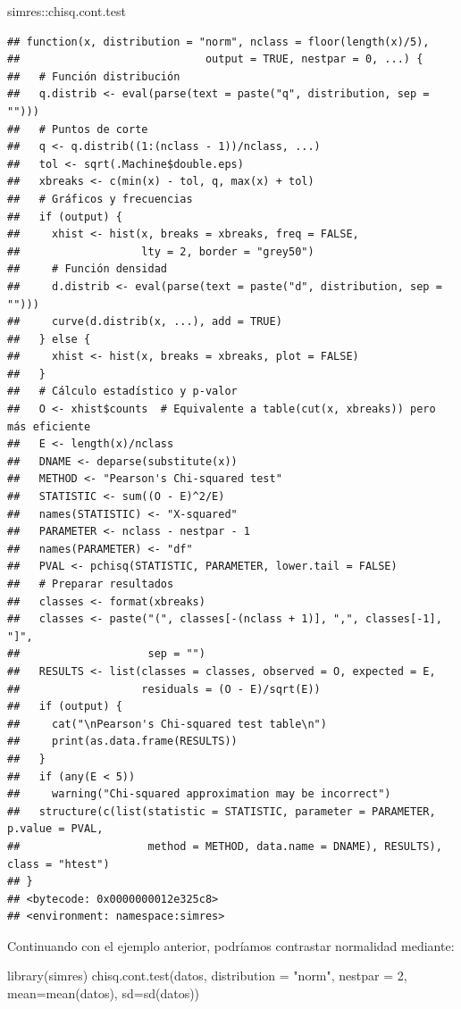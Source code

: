 \documentclass[
]{book}
\newenvironment{Shaded}{\begin{snugshade}}{\end{snugshade}}
\newcommand{\AttributeTok}[1]{\textcolor[rgb]{0.77,0.63,0.00}{#1}}
\newcommand{\DecValTok}[1]{\textcolor[rgb]{0.00,0.00,0.81}{#1}}
\newcommand{\FunctionTok}[1]{\textcolor[rgb]{0.00,0.00,0.00}{#1}}
\newcommand{\NormalTok}[1]{#1}
\newcommand{\SpecialCharTok}[1]{\textcolor[rgb]{0.00,0.00,0.00}{#1}}
\newcommand{\StringTok}[1]{\textcolor[rgb]{0.31,0.60,0.02}{#1}}
\theoremstyle{break}
\theoremstyle{nonumberplain}
\begin{document}
\begin{Shaded}
\begin{Highlighting}[]
\NormalTok{simres}\SpecialCharTok{::}\NormalTok{chisq.cont.test}
\end{Highlighting}
\end{Shaded}

\begin{verbatim}
## function(x, distribution = "norm", nclass = floor(length(x)/5),
##                             output = TRUE, nestpar = 0, ...) {
##   # Función distribución
##   q.distrib <- eval(parse(text = paste("q", distribution, sep = "")))
##   # Puntos de corte
##   q <- q.distrib((1:(nclass - 1))/nclass, ...)
##   tol <- sqrt(.Machine$double.eps)
##   xbreaks <- c(min(x) - tol, q, max(x) + tol)
##   # Gráficos y frecuencias
##   if (output) {
##     xhist <- hist(x, breaks = xbreaks, freq = FALSE,
##                   lty = 2, border = "grey50")
##     # Función densidad
##     d.distrib <- eval(parse(text = paste("d", distribution, sep = "")))
##     curve(d.distrib(x, ...), add = TRUE)
##   } else {
##     xhist <- hist(x, breaks = xbreaks, plot = FALSE)
##   }
##   # Cálculo estadístico y p-valor
##   O <- xhist$counts  # Equivalente a table(cut(x, xbreaks)) pero más eficiente
##   E <- length(x)/nclass
##   DNAME <- deparse(substitute(x))
##   METHOD <- "Pearson's Chi-squared test"
##   STATISTIC <- sum((O - E)^2/E)
##   names(STATISTIC) <- "X-squared"
##   PARAMETER <- nclass - nestpar - 1
##   names(PARAMETER) <- "df"
##   PVAL <- pchisq(STATISTIC, PARAMETER, lower.tail = FALSE)
##   # Preparar resultados
##   classes <- format(xbreaks)
##   classes <- paste("(", classes[-(nclass + 1)], ",", classes[-1], "]",
##                    sep = "")
##   RESULTS <- list(classes = classes, observed = O, expected = E,
##                   residuals = (O - E)/sqrt(E))
##   if (output) {
##     cat("\nPearson's Chi-squared test table\n")
##     print(as.data.frame(RESULTS))
##   }
##   if (any(E < 5))
##     warning("Chi-squared approximation may be incorrect")
##   structure(c(list(statistic = STATISTIC, parameter = PARAMETER, p.value = PVAL,
##                    method = METHOD, data.name = DNAME), RESULTS), class = "htest")
## }
## <bytecode: 0x0000000012e325c8>
## <environment: namespace:simres>
\end{verbatim}

Continuando con el ejemplo anterior, podríamos contrastar normalidad mediante:

\begin{Shaded}
\begin{Highlighting}[]
\FunctionTok{library}\NormalTok{(simres)}
\FunctionTok{chisq.cont.test}\NormalTok{(datos, }\AttributeTok{distribution =} \StringTok{"norm"}\NormalTok{, }\AttributeTok{nestpar =} \DecValTok{2}\NormalTok{, }\AttributeTok{mean=}\FunctionTok{mean}\NormalTok{(datos), }\AttributeTok{sd=}\FunctionTok{sd}\NormalTok{(datos))}
\end{Highlighting}
\end{Shaded}
\end{document}
